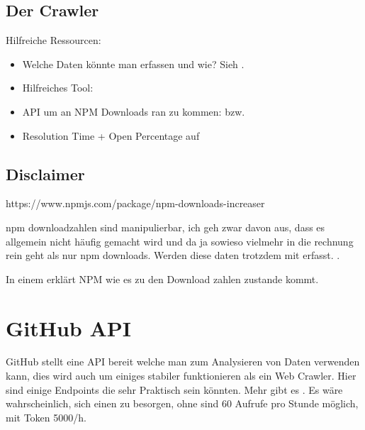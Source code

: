 

\subsection{Der Crawler}

Hilfreiche Ressourcen:

\begin{itemize}
    \item Welche Daten könnte man erfassen und wie? Sieh .
    \item Hilfreiches Tool: 
    \item API um an NPM Downloads ran zu kommen:
          bzw.
    \item Resolution Time + Open Percentage auf 
\end{itemize}



\subsection{Disclaimer}

https://www.npmjs.com/package/npm-downloads-increaser

npm downloadzahlen sind manipulierbar, ich geh zwar davon aus, dass es allgemein nicht häufig gemacht wird
und da ja sowieso vielmehr in die rechnung rein geht als nur npm downloads. Werden diese daten trotzdem mit erfasst.
.

In einem 
erklärt NPM wie es zu den Download zahlen zustande kommt.


\section{GitHub API}
GitHub stellt eine API bereit welche man zum Analysieren von Daten verwenden kann, dies wird auch um
einiges stabiler funktionieren als ein Web Crawler. Hier sind einige Endpoints die sehr Praktisch sein könnten.
Mehr gibt es . Es wäre wahrscheinlich, sich
einen 
zu besorgen, ohne sind 60 Aufrufe pro Stunde möglich, mit Token 5000/h.

